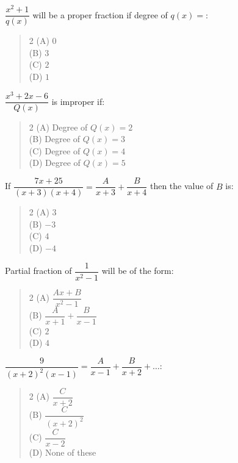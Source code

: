 \documentclass[11pt,a4paper]{article}
\begin{document}
\begin{mcqlist}
\item $\dfrac{x^2+1}{q(x)}$ will be a proper fraction if degree of $q(x)=$:
\begin{quote}\begin{multicols}{2}
\noindent (A) $0$ \\
(B) $3$ \\
(C) $2$ \\
(D) $1$
\end{multicols}\end{quote}

\item $\dfrac{x^3+2x-6}{Q(x)}$ is improper if:
\begin{quote}\begin{multicols}{2}
\noindent (A) Degree of $Q(x)=2$ \\
(B) Degree of $Q(x)=3$ \\
(C) Degree of $Q(x)=4$ \\
(D) Degree of $Q(x)=5$
\end{multicols}\end{quote}

\item If $\dfrac{7x+25}{(x+3)(x+4)}=\dfrac{A}{x+3}+\dfrac{B}{x+4}$ then the value of $B$ is:
\begin{quote}\begin{multicols}{2}
\noindent (A) $3$ \\
(B) $-3$ \\
(C) $4$ \\
(D) $-4$
\end{multicols}\end{quote}

\item Partial fraction of $\dfrac{1}{x^2-1}$ will be of the form:
\begin{quote}\begin{multicols}{2}
\noindent (A) $\dfrac{Ax+B}{x^2-1}$ \\
(B) $\dfrac{A}{x+1}+\dfrac{B}{x-1}$ \\
(C) $2$ \\
(D) $4$
\end{multicols}\end{quote}

\item $\dfrac{9}{(x+2)^2(x-1)}=\dfrac{A}{x-1}+\dfrac{B}{x+2}+\ldots$:
\begin{quote}\begin{multicols}{2}
\noindent (A) $\dfrac{C}{x+2}$ \\
(B) $\dfrac{C}{(x+2)^2}$ \\
(C) $\dfrac{C}{x-2}$ \\
(D) None of these
\end{multicols}\end{quote}


\end{mcqlist}
\end{document}
